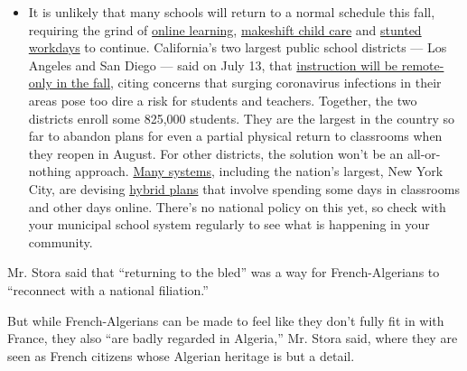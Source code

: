 \begin{itemize}
  \begin{itemize}
  \tightlist
  \item
    It is unlikely that many schools will return to a normal schedule
    this fall, requiring the grind of
    \href{https://www.nytimes3xbfgragh.onion/2020/06/05/us/coronavirus-education-lost-learning.html?action=click\&pgtype=Article\&state=default\&region=MAIN_CONTENT_3\&context=storylines_faq}{online
    learning},
    \href{https://www.nytimes3xbfgragh.onion/2020/05/29/us/coronavirus-child-care-centers.html?action=click\&pgtype=Article\&state=default\&region=MAIN_CONTENT_3\&context=storylines_faq}{makeshift
    child care} and
    \href{https://www.nytimes3xbfgragh.onion/2020/06/03/business/economy/coronavirus-working-women.html?action=click\&pgtype=Article\&state=default\&region=MAIN_CONTENT_3\&context=storylines_faq}{stunted
    workdays} to continue. California's two largest public school
    districts --- Los Angeles and San Diego --- said on July 13, that
    \href{https://www.nytimes3xbfgragh.onion/2020/07/13/us/lausd-san-diego-school-reopening.html?action=click\&pgtype=Article\&state=default\&region=MAIN_CONTENT_3\&context=storylines_faq}{instruction
    will be remote-only in the fall}, citing concerns that surging
    coronavirus infections in their areas pose too dire a risk for
    students and teachers. Together, the two districts enroll some
    825,000 students. They are the largest in the country so far to
    abandon plans for even a partial physical return to classrooms when
    they reopen in August. For other districts, the solution won't be an
    all-or-nothing approach.
    \href{https://bioethics.jhu.edu/research-and-outreach/projects/eschool-initiative/school-policy-tracker/}{Many
    systems}, including the nation's largest, New York City, are
    devising
    \href{https://www.nytimes3xbfgragh.onion/2020/06/26/us/coronavirus-schools-reopen-fall.html?action=click\&pgtype=Article\&state=default\&region=MAIN_CONTENT_3\&context=storylines_faq}{hybrid
    plans} that involve spending some days in classrooms and other days
    online. There's no national policy on this yet, so check with your
    municipal school system regularly to see what is happening in your
    community.
  \end{itemize}
\end{itemize}

Mr. Stora said that ``returning to the bled'' was a way for
French-Algerians to ``reconnect with a national filiation.''

But while French-Algerians can be made to feel like they don't fully fit
in with France, they also ``are badly regarded in Algeria,'' Mr. Stora
said, where they are seen as French citizens whose Algerian heritage is
but a detail.

